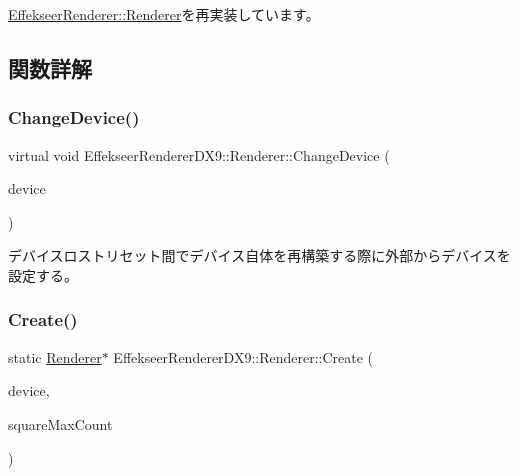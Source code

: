 \mbox{\hyperlink{class_effekseer_renderer_1_1_renderer_ad85143b942b06b4fa4741713f7bcd84b}{Effekseer\+Renderer\+::\+Renderer}}を再実装しています。



\subsection{関数詳解}
\mbox{\label{class_effekseer_renderer_d_x9_1_1_renderer_a08f6d85779736243059040d86c573df8}} 
\subsubsection{\texorpdfstring{Change\+Device()}{ChangeDevice()}}
{\footnotesize\ttfamily virtual void Effekseer\+Renderer\+D\+X9\+::\+Renderer\+::\+Change\+Device (\begin{DoxyParamCaption}\item[{L\+P\+D\+I\+R\+E\+C\+T3\+D\+D\+E\+V\+I\+C\+E9}]{device }\end{DoxyParamCaption})\hspace{0.3cm}{\ttfamily [pure virtual]}}



デバイスロストリセット間でデバイス自体を再構築する際に外部からデバイスを設定する。 

\mbox{\label{class_effekseer_renderer_d_x9_1_1_renderer_aadd9f57a16e8291dccd27d2e1c03edc4}} 
\subsubsection{\texorpdfstring{Create()}{Create()}}
{\footnotesize\ttfamily static \mbox{\hyperlink{class_effekseer_renderer_d_x9_1_1_renderer}{Renderer}}$\ast$ Effekseer\+Renderer\+D\+X9\+::\+Renderer\+::\+Create (\begin{DoxyParamCaption}\item[{L\+P\+D\+I\+R\+E\+C\+T3\+D\+D\+E\+V\+I\+C\+E9}]{device,  }\item[{int32\+\_\+t}]{square\+Max\+Count }\end{DoxyParamCaption})\hspace{0.3cm}{\ttfamily [static]}}




